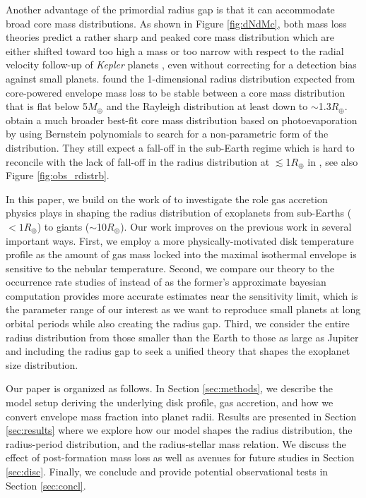 \documentclass[twocolumn]{aastex631}
\begin{document}
Another advantage of the primordial radius gap is that it can accommodate broad core mass distributions. As shown in Figure \ref{fig:dNdMc}, both mass loss theories predict a rather sharp and peaked core mass distribution which are either shifted toward too high a mass \citep{Wu19} or too narrow \citep{Gupta19} with respect to the radial velocity follow-up of {\it Kepler} planets \citep{Marcy14}, even without correcting for a detection bias against small planets. \citet{Ginzburg18} found the 1-dimensional radius distribution expected from core-powered envelope mass loss to be stable between a core mass distribution that is flat below 5$M_\oplus$ and the Rayleigh distribution at least down to $\sim$1.3$R_\oplus$. \citet{Rogers21_pevap} obtain a much broader best-fit core mass distribution based on photoevaporation by using Bernstein polynomials to search for a non-parametric form of the distribution. They still expect a fall-off in the sub-Earth regime which is hard to reconcile with the lack of fall-off in the radius distribution at $\lesssim$1$R_\oplus$ in \citet{Hsu19}, see also Figure \ref{fig:obs_rdistrb}.

In this paper, we build on the work of \citet{Lee21} to investigate the role gas accretion physics plays in shaping the radius distribution of exoplanets from sub-Earths ($<1R_\oplus$) to giants ($\sim$10$R_\oplus$). Our work improves on the previous work in several important ways. First, we employ a more physically-motivated disk temperature profile as the amount of gas mass locked into the maximal isothermal envelope is sensitive to the nebular temperature. Second, we compare our theory to the occurrence rate studies of \citet{Hsu19} instead of \citet{Fulton18} as the former's approximate bayesian computation provides more accurate estimates near the sensitivity limit, which is the parameter range of our interest as we want to reproduce small planets at long orbital periods while also creating the radius gap. Third, we consider the entire radius distribution from those smaller than the Earth to those as large as Jupiter and including the radius gap to seek a unified theory that shapes the exoplanet size distribution.  

Our paper is organized as follows. In Section \ref{sec:methods}, we describe the model setup deriving the underlying disk profile, gas accretion, and how we convert envelope mass fraction into planet radii. Results are presented in Section \ref{sec:results} where we explore how our model shapes the radius distribution, the radius-period distribution, and the radius-stellar mass relation. We discuss the effect of post-formation mass loss as well as avenues for future studies in Section \ref{sec:disc}. Finally, we conclude and provide potential observational tests in Section \ref{sec:concl}.
\end{document}
